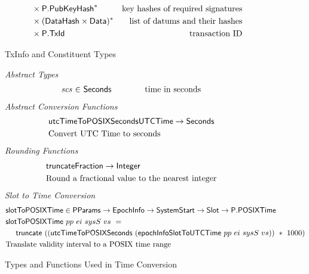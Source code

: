 \begin{figure*}[htb]
\begin{align*}
      & ~~~~ \times \seqof{\type{P.PubKeyHash}}
      & \text{key hashes of required signatures} \\ %
      & ~~~~ \times \seqof{(\DataHash \times \Data)}
      & \text{list of datums and their hashes} \\ %
      & ~~~~ \times \type{P.TxId}  %
      & \text{transaction ID}
  \end{align*}
  \caption{TxInfo and Constituent Types}
  \label{fig:txinfo-types-two}
\end{figure*}

\begin{figure*}[htb]
  \emph{Abstract Types}
  \begin{equation*}
    \begin{array}{r@{~\in~}l@{\quad\quad\quad\quad}r}
      \var{scs} & \type{Seconds} & \text{time in seconds}
    \end{array}
  \end{equation*}
  \emph{Abstract Conversion Functions}
  \begin{align*}
    & \mathsf{utcTimeToPOSIXSeconds} \mathsf{UTCTime} \to \mathsf{Seconds} \\
    & \text{Convert UTC Time to seconds}
  \end{align*}
  \emph{Rounding Functions}
  \begin{align*}
    & \mathsf{truncate} \mathsf{Fraction} \to \mathsf{Integer} \\
    & \text{Round a fractional value to the nearest integer}
  \end{align*}
  \emph{Slot to Time Conversion}
  \begin{align*}
    & \mathsf{slotToPOSIXTime} \in \mathsf{PParams} \to \mathsf{EpochInfo} \to \mathsf{SystemStart} \to \mathsf{Slot} \to \mathsf{P.POSIXTime} \\
    & \mathsf{slotToPOSIXTime}~pp~ei~sysS~vs~=~\\
    & ~~~~\mathsf{truncate}~ ((\mathsf{utcTimeToPOSIXSeconds}~(\mathsf{epochInfoSlotToUTCTime}~pp~ei~sysS~vs))~*~1000) \\
    & \text{Translate validity interval to a POSIX time range}
  \end{align*}
  \caption{Types and Functions Used in Time Conversion}
  \label{fig:time-funcs}
\end{figure*}

